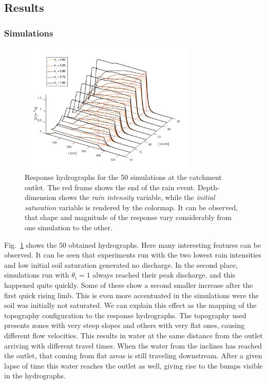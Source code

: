 \subsection{Results}
\subsubsection{Simulations}\label{sec:simulations_results}

\begin{figure}[h]
  \centering
  \includegraphics[width=0.75\textwidth]{Figures/hydrographs3d.png}
  \caption{Response hydrographs for the \num{50} simulations at the catchment outlet. The red frame shows the end of the rain event. Depth-dimension shows the \emph{rain intensity} variable, while the \emph{initial saturation} variable is rendered by the colormap. It can be observed, that shape and magnitude of the response vary considerably from one simulation to the other.}
  \label{fig:hydrographs3d}
\end{figure}


Fig.~\ref{fig:hydrographs3d} shows the \num{50} obtained hydrographs.
Here many interesting features can be observed.
It can be seen that experiments run with the two lowest rain intensities and low initial soil saturation generated no discharge.
In the second place, simulations run with $\theta_i = \num{1}$ always reached their peak discharge, and this happened quite quickly.
Some of these show a second smaller increase after the first quick rising limb.
This is even more accentuated in the simulations were the soil was initially not saturated.
We can explain this effect as the mapping of the topography configuration to the response hydrographs.
The topography used presents zones with very steep slopes and others with very flat ones, causing different flow velocities.
This results in water at the same distance from the outlet arriving with different travel times.
When the water from the inclines has reached the outlet, that coming from flat areas is still traveling downstream.
After a given lapse of time this water reaches the outlet as well, giving rise to the bumps visible in the hydrographs.\\


